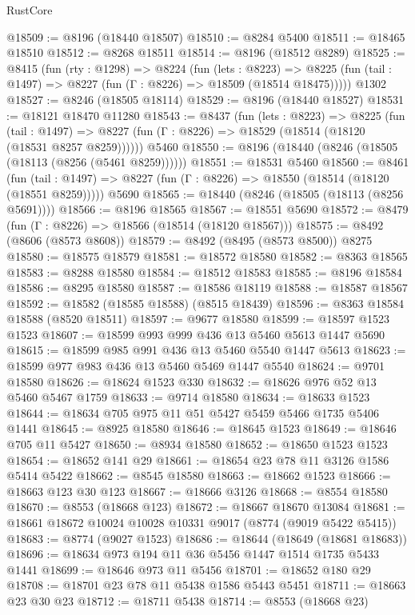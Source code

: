 \begin{lexlean}{RustCore}
\begin{coremodule}
@18509 := @8196 (@18440 @18507)
@18510 := @8284 @5400
@18511 := @18465 @18510
@18512 := @8268 @18511
@18514 := @8196 (@18512 @8289)
@18525 := @8415
    (fun (rty : @1298) =>
    @8224
      (fun (lets : @8223) =>
      @8225 (fun (tail : @1497) => @8227 (fun (Γ : @8226) => @18509 (@18514 @18475)))))
    @1302
@18527 := @8246 (@18505 @18114)
@18529 := @8196 (@18440 @18527)
@18531 := @18121 @18470 @11280
@18543 := @8437
    (fun (lets : @8223) =>
    @8225
      (fun (tail : @1497) =>
      @8227 (fun (Γ : @8226) => @18529 (@18514 (@18120 (@18531 @8257 @8259))))))
    @5460
@18550 := @8196 (@18440 (@8246 (@18505 (@18113 (@8256 (@5461 @8259))))))
@18551 := @18531 @5460
@18560 := @8461
    (fun (tail : @1497) => @8227 (fun (Γ : @8226) => @18550 (@18514 (@18120 (@18551 @8259)))))
    @5690
@18565 := @18440 (@8246 (@18505 (@18113 (@8256 @5691))))
@18566 := @8196 @18565
@18567 := @18551 @5690
@18572 := @8479 (fun (Γ : @8226) => @18566 (@18514 (@18120 @18567)))
@18575 := @8492 (@8606 (@8573 @8608))
@18579 := @8492 (@8495 (@8573 @8500)) @8275
@18580 := @18575 @18579
@18581 := @18572 @18580
@18582 := @8363 @18565
@18583 := @8288 @18580
@18584 := @18512 @18583
@18585 := @8196 @18584
@18586 := @8295 @18580
@18587 := @18586 @18119
@18588 := @18587 @18567
@18592 := @18582 (@18585 @18588) (@8515 @18439)
@18596 := @8363 @18584 @18588 (@8520 @18511)
@18597 := @9677 @18580
@18599 := @18597 @1523 @1523
@18607 := @18599 @993 @999 @436 @13 @5460 @5613 @1447 @5690
@18615 := @18599 @985 @991 @436 @13 @5460 @5540 @1447 @5613
@18623 := @18599 @977 @983 @436 @13 @5460 @5469 @1447 @5540
@18624 := @9701 @18580
@18626 := @18624 @1523 @330
@18632 := @18626 @976 @52 @13 @5460 @5467 @1759
@18633 := @9714 @18580
@18634 := @18633 @1523
@18644 := @18634 @705 @975 @11 @51 @5427 @5459 @5466 @1735 @5406 @1441
@18645 := @8925 @18580
@18646 := @18645 @1523
@18649 := @18646 @705 @11 @5427
@18650 := @8934 @18580
@18652 := @18650 @1523 @1523
@18654 := @18652 @141 @29
@18661 := @18654 @23 @78 @11 @3126 @1586 @5414 @5422
@18662 := @8545 @18580
@18663 := @18662 @1523
@18666 := @18663 @123 @30 @123
@18667 := @18666 @3126
@18668 := @8554 @18580
@18670 := @8553 (@18668 @123)
@18672 := @18667 @18670 @13084
@18681 := @18661 @18672 @10024 @10028 @10331 @9017 (@8774 (@9019 @5422 @5415))
@18683 := @8774 (@9027 @1523)
@18686 := @18644 (@18649 (@18681 @18683))
@18696 := @18634 @973 @194 @11 @36 @5456 @1447 @1514 @1735 @5433 @1441
@18699 := @18646 @973 @11 @5456
@18701 := @18652 @180 @29
@18708 := @18701 @23 @78 @11 @5438 @1586 @5443 @5451
@18711 := @18663 @23 @30 @23
@18712 := @18711 @5438
@18714 := @8553 (@18668 @23)

\end{coremodule}
\end{lexlean}
